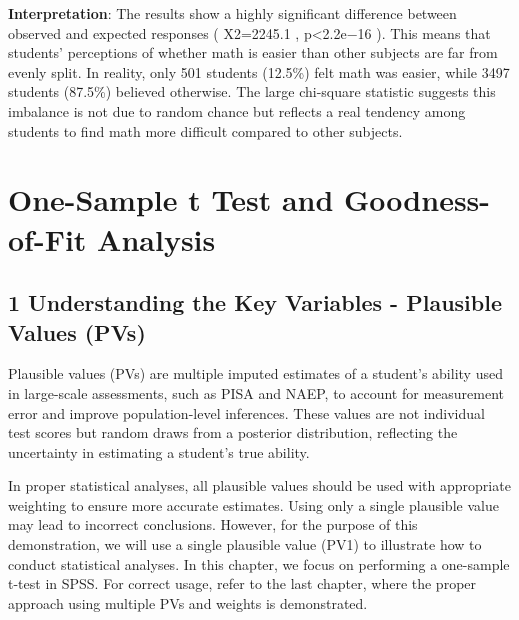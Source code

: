 \documentclass[
  letterpaper,
  DIV=11,
  numbers=noendperiod]{scrreprt}
\begin{document}
\textbf{Interpretation}: The results show a highly significant
difference between observed and expected responses ( X2=2245.1 ,
p\textless2.2e−16 ). This means that students' perceptions of whether
math is easier than other subjects are far from evenly split. In
reality, only 501 students (12.5\%) felt math was easier, while 3497
students (87.5\%) believed otherwise. The large chi-square statistic
suggests this imbalance is not due to random chance but reflects a real
tendency among students to find math more difficult compared to other
subjects.


\chapter*{One-Sample t Test and Goodness-of-Fit
Analysis}\label{one-sample-t-test-and-goodness-of-fit-analysis}


\section*{1 Understanding the Key Variables - Plausible Values
(PVs)}\label{understanding-the-key-variables---plausible-values-pvs}


Plausible values (PVs) are multiple imputed estimates of a student's
ability used in large-scale assessments, such as PISA and NAEP, to
account for measurement error and improve population-level inferences.
These values are not individual test scores but random draws from a
posterior distribution, reflecting the uncertainty in estimating a
student's true ability.

In proper statistical analyses, all plausible values should be used with
appropriate weighting to ensure more accurate estimates. Using only a
single plausible value may lead to incorrect conclusions. However, for
the purpose of this demonstration, we will use a single plausible value
(PV1) to illustrate how to conduct statistical analyses. In this
chapter, we focus on performing a one-sample t-test in SPSS. For correct
usage, refer to the last chapter, where the proper approach using
multiple PVs and weights is demonstrated.
\end{document}
